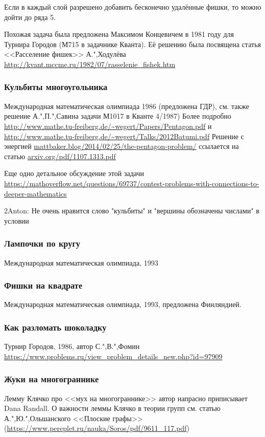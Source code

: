 \documentclass[twoside]{book}
\begin{document}
Если в каждый слой разрешено добавить бесконечно удалённые фишки, то можно дойти до ряда 5. 

Похожая задача была предложена Максимом Концевичем в 1981 году для Турнира Городов (М715 в задачнике Кванта).
Её решению была посвящена статья <<Расселение фишек>> А.",Ходулёва \url{http://kvant.mccme.ru/1982/07/rasselenie_fishek.htm}

\subsubsection{Кульбиты многоугольника}
Международная математическая олимпиада 1986 (предложена ГДР), см. также решение А.",П.",Савина задачи М1017 в Кванте 4/1987)  
Более подробно \url{http://www.mathe.tu-freiberg.de/~wegert/Papers/Pentagon.pdf} и 
\url{http://www.mathe.tu-freiberg.de/~wegert/Talks/2012Batumi.pdf} 
Решение с энергией \url{mattbaker.blog/2014/02/25/the-pentagon-problem/} ссылается на статью \url{arxiv.org/pdf/1107.1313.pdf} 

Еще одно детальное обсуждение этой задачи 
\url{https://mathoverflow.net/questions/69737/contest-problems-with-connections-to-deeper-mathematics}

2Anton: Не очень нравится слово "кульбиты" и "вершины обозначены числами" в условии

\subsubsection{Лампочки по кругу}
Международная математическая олимпиада, 1993

\subsubsection{Фишки на квадрате}
Международная математическая олимпиада, 1993, предложена Финляндией.

\subsubsection{Как разломать шоколадку}
Турнир Городов, 1986, автор  С.",В.",Фомин
\url{https://www.problems.ru/view_problem_details_new.php?id=97909}

\subsubsection{Жуки на многограннике}
Лемму Клячко про <<мух на многограннике>> автор напрасно приписывает Dana Randall. 
О важности леммы Клячко в теории групп см. статью А.",Ю.",Ольшанского <<Плоские графы>> 
(\url{https://www.pereplet.ru/nauka/Soros/pdf/9611_117.pdf})
\end{document}
